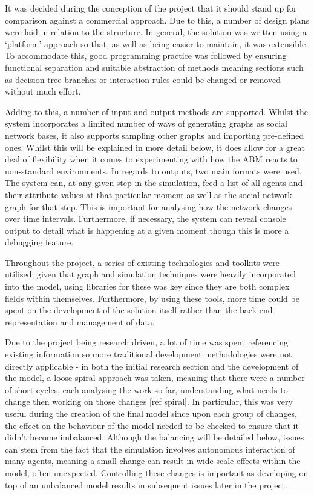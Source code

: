 \documentclass[]{report}
\begin{document}
It was decided during the conception of the project that it should stand up for comparison against a commercial approach. Due to this, a number of design plans were laid in relation to the structure. In general, the solution was written using a `platform' approach so that, as well as being easier to maintain, it was extensible. To accommodate this, good programming practice was followed by ensuring functional separation and suitable abstraction of methods meaning sections such as decision tree branches or interaction rules could be changed or removed without much effort.

Adding to this, a number of input and output methods are supported. Whilst the system incorporates a limited number of ways of generating graphs as social network bases, it also supports sampling other graphs and importing pre-defined ones. Whilst this will be explained in more detail below, it does allow for a great deal of flexibility when it comes to experimenting with how the ABM reacts to non-standard environments. In regards to outputs, two main formats were used. The system can, at any given step in the simulation, feed a list of all agents and their attribute values at that particular moment as well as the social network graph for that step. This is important for analysing how the network changes over time intervals. Furthermore, if necessary, the system can reveal console output to detail what is happening at a given moment though this is more a debugging feature.

Throughout the project, a series of existing technologies and toolkits were utilised; given that graph and simulation techniques were heavily incorporated into the model, using libraries for these was key since they are both complex fields within themselves. Furthermore, by using these tools, more time could be spent on the development of the solution itself rather than the back-end representation and management of data.

Due to the project being research driven, a lot of time was spent referencing existing information so more traditional development methodologies were not directly applicable - in both the initial research section and the development of the model, a loose spiral approach was taken, meaning that there were a number of short cycles, each analysing the work so far, understanding what needs to change then working on those changes [ref spiral]. In particular, this was very useful during the creation of the final model since upon each group of changes, the effect on the behaviour of the model needed to be checked to ensure that it didn't become imbalanced. Although the balancing will be detailed below, issues can stem from the fact that the simulation involves autonomous interaction of many agents, meaning a small change can result in wide-scale effects within the model, often unexpected. Controlling these changes is important as developing on top of an unbalanced model results in subsequent issues later in the project.
\end{document}
